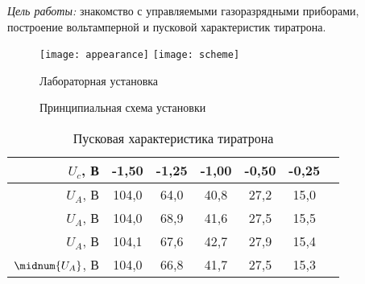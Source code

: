\documentclass[10pt,pscyr,nonums]{hedlabwork}
\begin{document}
    \makeheader

    \emph{Цель работы:} знакомство с управляемыми газоразрядными приборами,
    построение вольтамперной и пусковой характеристик тиратрона.
    
    \begin{figure}[h!]
        \center
        \texttt{[image: appearance]} \hspace*{2em}
        \texttt{[image: scheme]}
        \parbox{.37\textwidth}{\caption{Лабораторная установка}}
        \hspace*{2em}
        \parbox{.45\textwidth}{\caption{Принципиальная схема установки}}
    \end{figure}
    
    \begin{table}[h!]
        \center
        \caption{Пусковая характеристика тиратрона}
        \begin{tabular}{|r|*{6}{C{.07}|}} \hline
            \( U_c \), В & -1,50 & -1,25 & -1,00 & -0,50 & -0,25 \\ \hline
            \( U_A \), В & 104,0 & 64,0 & 40,8 & 27,2 & 15,0 \\ \hline
            \( U_A \), В & 104,0 & 68,9 & 41,6 & 27,5 & 15,5 \\ \hline
            \( U_A \), В & 104,1 & 67,6 & 42,7 & 27,9 & 15,4 \\ \hline
            \( \midnum{U_A} \), В & 104,0 & 66,8 & 41,7 & 27,5 & 15,3 \\ \hline
        \end{tabular}
    \end{table}
    
\end{document}
